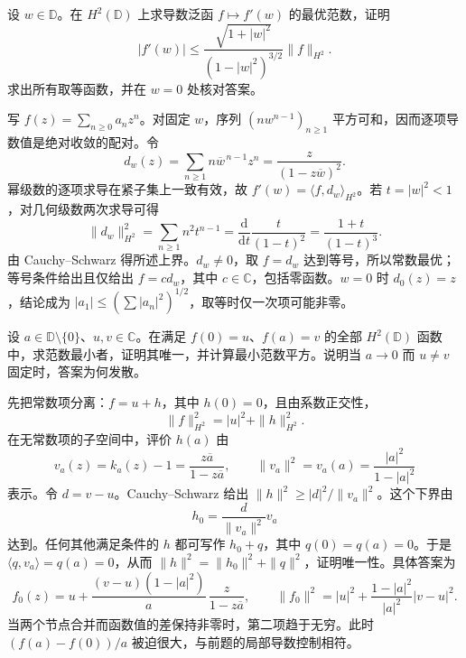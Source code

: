 \begin{exercise}\label{b3:ex:28-2}
设 \(w\in\mathbb D\)。在 \(H^2(\mathbb D)\) 上求导数泛函 \(f\mapsto f'(w)\) 的最优范数，证明
\[
 |f'(w)|\le\frac{\sqrt{1+|w|^2}}{(1-|w|^2)^{3/2}}\|f\|_{H^2}.
\]
求出所有取等函数，并在 \(w=0\) 处核对答案。
\end{exercise}
\begin{solution}
写 \(f(z)=\sum_{n\ge0}a_nz^n\)。对固定 \(w\)，序列 \((n w^{n-1})_{n\ge1}\) 平方可和，因而逐项导数值是绝对收敛的配对。令
\[
 d_w(z)=\sum_{n\ge1}n\overline w^{\,n-1}z^n
       =\frac{z}{(1-z\overline w)^2}.
\]
幂级数的逐项求导在紧子集上一致有效，故 \(f'(w)=\langle f,d_w\rangle_{H^2}\)。若 \(t=|w|^2<1\)，对几何级数两次求导可得
\[
 \|d_w\|_{H^2}^2=\sum_{n\ge1}n^2t^{n-1}
 =\frac{\mathrm d}{\mathrm dt}\frac{t}{(1-t)^2}
 =\frac{1+t}{(1-t)^3}.
\]
由 Cauchy--Schwarz 得所述上界。\(d_w\ne0\)，取 \(f=d_w\) 达到等号，所以常数最优；等号条件给出且仅给出 \(f=c d_w\)，其中 \(c\in\mathbb C\)，包括零函数。\(w=0\) 时 \(d_0(z)=z\)，结论成为 \(|a_1|\le(\sum|a_n|^2)^{1/2}\)，取等时仅一次项可能非零。
\end{solution}

\begin{exercise}\label{b3:ex:28-3}
设 \(a\in\mathbb D\setminus\{0\}\)、\(u,v\in\mathbb C\)。在满足 \(f(0)=u\)、\(f(a)=v\) 的全部 \(H^2(\mathbb D)\) 函数中，求范数最小者，证明其唯一，并计算最小范数平方。说明当 \(a\to0\) 而 \(u\ne v\) 固定时，答案为何发散。
\end{exercise}
\begin{solution}
先把常数项分离：\(f=u+h\)，其中 \(h(0)=0\)，且由系数正交性，
\[
 \|f\|_{H^2}^2=|u|^2+\|h\|_{H^2}^2.
\]
在无常数项的子空间中，评价 \(h(a)\) 由
\[
 v_a(z)=k_a(z)-1=\frac{z\overline a}{1-z\overline a},
 \qquad \|v_a\|^2=v_a(a)=\frac{|a|^2}{1-|a|^2}
\]
表示。令 \(d=v-u\)。Cauchy--Schwarz 给出
\(\|h\|^2\ge |d|^2/\|v_a\|^2\)。这个下界由
\[
 h_0=\frac{d}{\|v_a\|^2}v_a
\]
达到。任何其他满足条件的 \(h\) 都可写作 \(h_0+q\)，其中 \(q(0)=q(a)=0\)。于是 \(\langle q,v_a\rangle=q(a)=0\)，从而 \(\|h\|^2=\|h_0\|^2+\|q\|^2\)，证明唯一性。具体答案为
\[
 f_0(z)=u+\frac{(v-u)(1-|a|^2)}{a}\,
              \frac{z}{1-z\overline a},\qquad
 \|f_0\|^2=|u|^2+\frac{1-|a|^2}{|a|^2}|v-u|^2.
\]
当两个节点合并而函数值的差保持非零时，第二项趋于无穷。此时 \((f(a)-f(0))/a\) 被迫很大，与前题的局部导数控制相符。
\end{solution}

